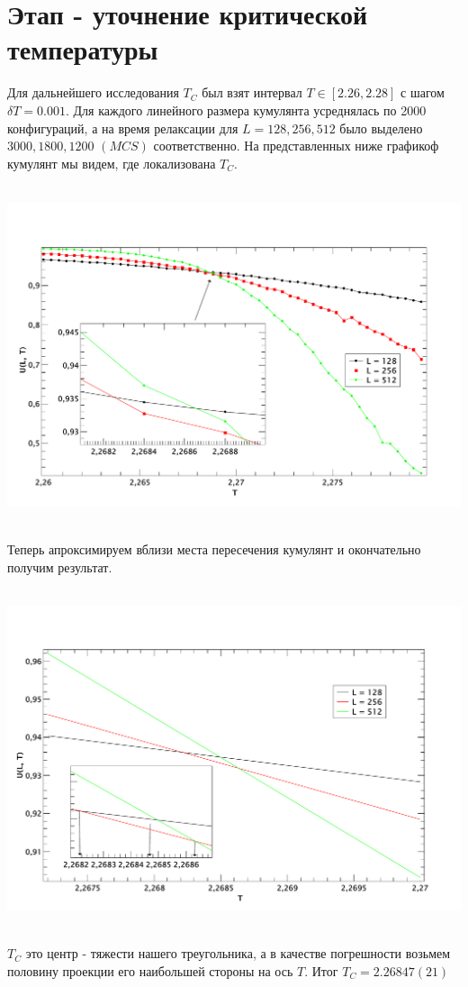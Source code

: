 \documentclass[12pt,a4paper]{article}
\begin{document}
	\section{Этап - уточнение критической температуры}
	Для дальнейшего исследования $T_C$
	был взят интервал $T \in [2.26, 2.28]$ с шагом $\delta T = 0.001$. Для каждого линейного размера кумулянта усреднялась по 2000 конфигураций, а на время релаксации для $L = 128, 256, 512$ было выделено $3000, 1800, 1200$ $(MCS)$ соответственно. На представленных ниже графикоф кумулянт мы видем,
	где локализована  $T_C$.
	\begin{center}
		\mbox{
			\includegraphics[scale=0.4]{kum2}
		}
	\end{center} 
	
	Теперь апроксимируем вблизи места пересечения кумулянт и окончательно получим результат.
	\begin{center}
		\mbox{
			\includegraphics[scale=0.4]{AKUM}
		}
	\end{center}
	$T_C$ это центр - тяжести нашего треугольника, а в качестве погрешности возьмем половину проекции его наибольшей стороны на ось $T$.
	Итог $T_C = 2.26847(21)$
\end{document}
